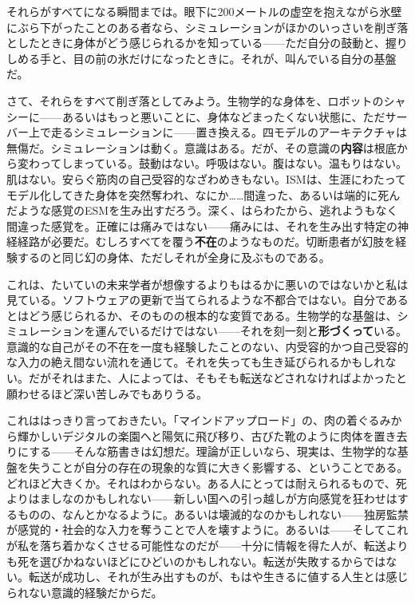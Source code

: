 \documentclass[11pt, twoside, openright]{book}
\begin{document}
それらがすべてになる瞬間までは。眼下に200メートルの虚空を抱えながら氷壁にぶら下がったことのある者なら、シミュレーションがほかのいっさいを削ぎ落としたときに身体がどう感じられるかを知っている------ただ自分の鼓動と、握りしめる手と、目の前の氷だけになったときに。それが、叫んでいる自分の基盤だ。

さて、それらをすべて削ぎ落としてみよう。生物学的な身体を、ロボットのシャシーに------あるいはもっと悪いことに、身体などまったくない状態に、ただサーバー上で走るシミュレーションに------置き換える。四モデルのアーキテクチャは無傷だ。シミュレーションは動く。意識はある。だが、その意識の\textbf{内容}は根底から変わってしまっている。鼓動はない。呼吸はない。腹はない。温もりはない。肌はない。安らぐ筋肉の自己受容的なざわめきもない。ISMは、生涯にわたってモデル化してきた身体を突然奪われ、なにか……間違った、あるいは端的に死んだような感覚のESMを生み出すだろう。深く、はらわたから、逃れようもなく間違った感覚を。正確には痛みではない------痛みには、それを生み出す特定の神経経路が必要だ。むしろすべてを覆う\textbf{不在}のようなものだ。切断患者が幻肢を経験するのと同じ幻の身体、ただしそれが全身に及ぶものである。

これは、たいていの未来学者が想像するよりもはるかに悪いのではないかと私は見ている。ソフトウェアの更新で当てられるような不都合ではない。自分であるとはどう感じられるか、そのものの根本的な変質である。生物学的な基盤は、シミュレーションを運んでいるだけではない------それを刻一刻と\textbf{形づくって}いる。意識的な自己がその不在を一度も経験したことのない、内受容的かつ自己受容的な入力の絶え間ない流れを通じて。それを失っても生き延びられるかもしれない。だがそれはまた、人によっては、そもそも転送などされなければよかったと願わせるほど深い苦しみでもありうる。

これははっきり言っておきたい。「マインドアップロード」の、肉の着ぐるみから輝かしいデジタルの楽園へと陽気に飛び移り、古びた靴のように肉体を置き去りにする------そんな筋書きは幻想だ。理論が正しいなら、現実は、生物学的な基盤を失うことが自分の存在の現象的な質に大きく影響する、ということである。どれほど大きくか。それはわからない。ある人にとっては耐えられるもので、死よりはましなのかもしれない------新しい国への引っ越しが方向感覚を狂わせはするものの、なんとかなるように。あるいは壊滅的なのかもしれない------独房監禁が感覚的・社会的な入力を奪うことで人を壊すように。あるいは------そしてこれが私を落ち着かなくさせる可能性なのだが------十分に情報を得た人が、転送よりも死を選びかねないほどにひどいのかもしれない。転送が失敗するからではない。転送が成功し、それが生み出すものが、もはや生きるに値する人生とは感じられない意識的経験だからだ。
\end{document}
